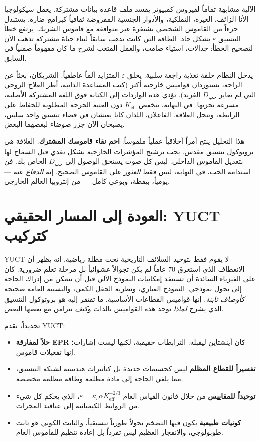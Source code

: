 \documentclass[12pt,a4paper]{article}
\begin{document}
	الآلية مشابهة تماماً لفيروس كمبيوتر يفسد ملف قاعدة بيانات مشتركة. يعمل سيكولوجيا الأنا الزائف، الغيرة، التملكية، والأدوار الجنسية المفروضة ثقافياً كبرامج ضارة. يستبدل جزءاً من القاموس الشخصي بشيفرة غير متوافقة مع قاموس الشريك. يرتفع خطأ التنسيق \(\varepsilon\) بشكل حاد. الطاقة التي كانت تذهب سابقاً لبناء حياة مشتركة تذهب الآن لتصحيح الخطأ: جدالات، استياء صامت، والعمل المتعب لشرح ما كان مفهوماً ضمنياً في السابق.
	
	يدخل النظام حلقة تغذية راجعة سلبية. يخلق \(\varepsilon\) المتزايد ألماً عاطفياً. الشريكان، بحثاً عن الراحة، يستوردان قواميس خارجية أكثر (كتب المساعدة الذاتية، أطر العلاج الزوجي التي لم تعاير \(D_{\text{حب}}\) الفريد). تؤدي هذه الواردات إلى الكتابة فوق اللغة المشتركة الأصلية، مسرعة تجزئها. في النهاية، ينخفض \(K_{\mathrm{eff}}\) دون العتبة الحرجة المطلوبة للحفاظ على الرابطة، وتنحل العلاقة. الفاعلان، اللذان كانا يعيشان في فضاء تنسيق واحد سلس، يصبحان الآن جزر ضوضاء لبعضهما البعض.
	
	هذا التحليل ينتج أمراً أخلاقياً عملياً ملموساً: \textbf{احم نقاء قاموسك المشترك}. العلاقة هي بروتوكول تنسيق مقدس. يجب ترشيح المؤشرات الخارجية بشكل نقدي قبل السماح لها بتعديل القاموس الداخلي. ليس كل صوت يستحق الوصول إلى \(D_{\text{حب}}\) الخاص بك. فن استدامة الحب، في النهاية، ليس فقط \emph{العثور} على القاموس الصحيح. إنه \emph{الدفاع} عنه — يومياً، بيقظة، وبوعي كامل — من إنتروبيا العالم الخارجي.
	
	\section{العودة إلى المسار الحقيقي: YUCT كتركيب}
	
	YUCT لا يقوم فقط بتوحيد السلائف التاريخية تحت مظلة رياضية. إنه يظهر أن الانعطاف الذي استغرق 70 عاماً لم يكن تجوالاً عشوائياً بل مرحلة تعلم ضرورية. كان على الفيزياء السائدة أن تستنفد إمكانيات النموذج الآلي قبل أن تتمكن من إدراك الحاجة إلى تحول نموذجي. النموذج العياري، ونظرية الحقل الكمي، والنسبية العامة صحيحة \emph{كأوصاف ثابتة}. إنها قواميس القطاعات الأساسية. ما تفتقر إليه هو بروتوكول التنسيق الذي يشرح \emph{لماذا} توجد هذه القواميس بالذات و\emph{كيف} تتزامن مع بعضها البعض.
	
	تحديداً، تقدم YUCT:
	\begin{itemize}
		\item \textbf{حلاً لمفارقة EPR} كان أينشتاين ليقبله: الترابطات حقيقية، لكنها ليست إشارات؛ إنها تفعيلات قاموس.
		\item \textbf{تفسيراً للقطاع المظلم} ليس كجسيمات جديدة بل كتأثيرات هندسية لشبكة التنسيق، مما يلغي الحاجة إلى مادة مظلمة وطاقة مظلمة مخصصة.
		\item \textbf{توحيداً للمقاييس} من خلال قانون القياس العام \(\varepsilon = \kappa_c \alpha K_{\mathrm{eff}}^{-2/3}\)، الذي يحكم كل شيء من الروابط الكيميائية إلى عناقيد المجرات.
		\item \textbf{كونيات طبيعية} يكون فيها التضخم تحولاً طورياً تنسيقياً، والثابت الكوني هو ثابت طوبولوجي، والانفجار العظيم ليس تفرداً بل إعادة تنظيم للقاموس العام.
	\end{itemize}
	
\end{document}
